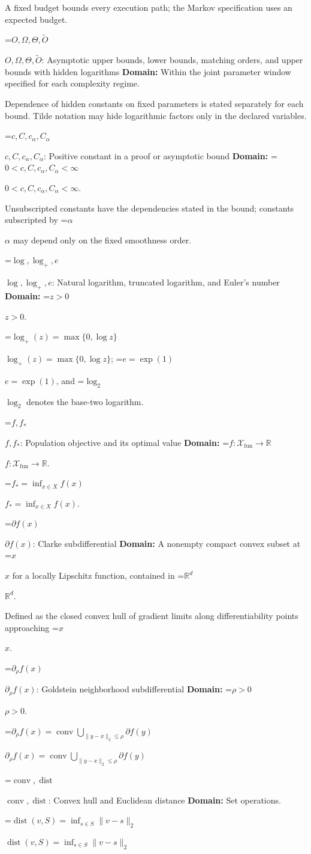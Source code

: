 \documentclass[10pt,a4paper]{article}
\newcommand{\AtlasMath}[1]{\par\begingroup\centering\setbox0=\hbox{$\displaystyle #1$}\ifdim\wd0>1.4\linewidth\typeout{ATLAS WIDE FORMULA: \the\wd0}\fi\ifdim\wd0>\linewidth\resizebox{\linewidth}{!}{\box0}\else\box0\fi\par\endgroup}
\newcommand{\AtlasInlineMath}[1]{\begingroup\setbox0=\hbox{$#1$}\ifdim\wd0>.4\linewidth\endgroup\AtlasMath{#1}\else\endgroup$#1$\fi}
\begin{document}
A fixed budget bounds every execution path; the Markov specification uses an expected budget.

\AtlasInlineMath{O,\Omega,\Theta,\widetilde{O}}: Asymptotic upper bounds, lower bounds, matching orders, and upper bounds with hidden logarithms \textbf{Domain:} Within the joint parameter window specified for each complexity regime.

Dependence of hidden constants on fixed parameters is stated separately for each bound. Tilde notation may hide logarithmic factors only in the declared variables.

\AtlasInlineMath{c,C,c_\alpha,C_\alpha}: Positive constant in a proof or asymptotic bound \textbf{Domain:} \AtlasInlineMath{0<c,C,c_\alpha,C_\alpha<\infty}.

Unsubscripted constants have the dependencies stated in the bound; constants subscripted by \AtlasInlineMath{\alpha} may depend only on the fixed smoothness order.

\AtlasInlineMath{\log,\log_+,e}: Natural logarithm, truncated logarithm, and Euler's number \textbf{Domain:} \AtlasInlineMath{z>0}.

\AtlasInlineMath{\log_+(z)=\max\{0,\log z\}}; \AtlasInlineMath{e=\exp(1)}, and \AtlasInlineMath{\log_2} denotes the base-two logarithm.

\AtlasInlineMath{f,f_*}: Population objective and its optimal value \textbf{Domain:} \AtlasInlineMath{f:\mathcal{X}_{\mathrm{fun}}\to\mathbb{R}}.

\AtlasInlineMath{f_*=\inf_{x\in X}f(x)}.

\AtlasInlineMath{\partial f(x)}: Clarke subdifferential \textbf{Domain:} A nonempty compact convex subset at \AtlasInlineMath{x} for a locally Lipschitz function, contained in \AtlasInlineMath{\mathbb{R}^d}.

Defined as the closed convex hull of gradient limits along differentiability points approaching \AtlasInlineMath{x}.

\AtlasInlineMath{\partial_\rho f(x)}: Goldstein neighborhood subdifferential \textbf{Domain:} \AtlasInlineMath{\rho>0}.

\AtlasInlineMath{\partial_\rho f(x)=\operatorname{conv}\bigcup_{\|y-x\|_2\le\rho}\partial f(y)}

\AtlasInlineMath{\operatorname{conv},\operatorname{dist}}: Convex hull and Euclidean distance \textbf{Domain:} Set operations.

\AtlasInlineMath{\operatorname{dist}(v,S)=\inf_{s\in S}\|v-s\|_2}
\end{document}
